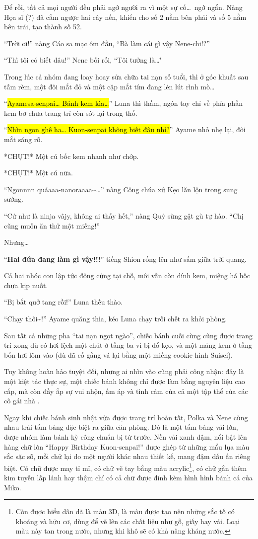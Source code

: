 \documentclass[../main.tex]{subfiles}
\begin{document}
Để rồi, tất cả mọi người đều phải ngớ người ra vì một sự cố\dots\ ngớ ngẩn. Nàng Họa sĩ (?) đã cắm ngược hai cây nến, khiến cho số 2 nằm bên phải và số 5 nằm bên trái, tạo thành số 52.

``Trời ơi!'' nàng Cáo sa mạc ôm đầu, ``Bà làm cái gì vậy Nene-chi!?''

``Thì tôi có biết đâu!'' Nene bối rối, ``Tôi tưởng là\dots\''

Trong lúc cả nhóm đang loay hoay sửa chữa tai nạn số tuổi, thì ở góc khuất sau tấm rèm, một đôi mắt đỏ và một cặp mắt tím đang lén lút rình mò\dots

``\hl{Ayamesa-senpai\dots{} Bánh kem kìa\dots}'' Luna thì thầm, ngón tay chỉ về phía phần kem bơ chưa trang trí còn sót lại trong thố.

``\hl{Nhìn ngon ghê ha\dots{} Kuon-senpai không biết đâu nhỉ?}'' Ayame nhỏ nhẹ lại, đôi mắt sáng rỡ.

*CHỤT!* Một cú bốc kem nhanh như chớp.

*CHỤT!* Một cú nữa.

``Ngonnnn quáaaa-nanoraaaa\~{}\dots'' nàng Công chúa xứ Kẹo lăn lộn trong sung sướng.

``Cứ như là ninja vâjy, không ai thấy hết,'' nàng Quỷ sừng gật gù tự hào. ``Chị cũng muốn ăn thử một miếng!''

Nhưng\dots

``\textbf{Hai đứa đang làm gì vậy!!!}'' tiếng Shion rống lên như sấm giữa trời quang.

Cả hai nhóc con lập tức đông cứng tại chỗ, môi vẫn còn dính kem, miệng há hốc chưa kịp nuốt.

``Bị bắt quở tang rồi!'' Luna thều thào.

``Chạy thôi\~{}!'' Ayame quăng thìa, kéo Luna chạy trối chết ra khỏi phòng.

Sau tất cả những pha ``tai nạn ngọt ngào'', chiếc bánh cuối cùng cũng được trang trí xong dù có hơi lệch một chút ở tầng ba vì bị đổ kẹo, và một mảng kem ở tầng bốn hơi lõm vào (dù đã cố gắng vá lại bằng một miếng cookie hình Suisei).

Tuy không hoàn hảo tuyệt đối, nhưng ai nhìn vào cũng phải công nhận: đây là một kiệt tác thực sự, một chiếc bánh không chỉ được làm bằng nguyên liệu cao cấp, mà còn đầy ắp sự vui nhộn, ấm áp và tình cảm của cả một tập thể của các cô gái nhà \hll.

Ngay khi chiếc bánh sinh nhật vừa được trang trí hoàn tất, Polka và Nene cùng nhau trải tấm bảng đặc biệt ra giữa căn phòng. Đó là một tấm bảng vải lớn, được nhóm làm bánh kỳ công chuẩn bị từ trước. Nền vải xanh đậm, nổi bật lên hàng chữ lớn ``Happy Birthday Kuon-senpai!'' được ghép từ những mẩu lụa màu sắc sặc sỡ, mỗi chữ lại do một người khác nhau thiết kế, mang đậm dấu ấn riêng biệt. Có chữ được may tỉ mỉ, có chữ vẽ tay bằng màu acrylic\footnote{Còn được hiểu dân dã là màu 3D, là màu được tạo nên những sắc tố có khoáng và hữu cơ, dùng để vẽ lên các chất liệu như gỗ, giấy hay vải. Loại màu này tan trong nước, nhưng khi khô sẽ có khả năng kháng nước.}, có chữ gắn thêm kim tuyến lấp lánh hay thậm chí có cả chữ được đính kèm hình hình bánh cá của Miko.
\end{document}
